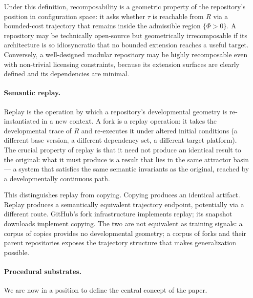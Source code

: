 \documentclass[11pt]{article}
\begin{document}
Under this definition, recomposability is a geometric property of the
repository's position in configuration space: it asks whether $\tau$ is
reachable from $R$ via a bounded-cost trajectory that remains inside the
admissible region $\{\Phi > 0\}$. A repository may be technically open-source
but geometrically irrecomposable if its architecture is so idiosyncratic that
no bounded extension reaches a useful target. Conversely, a well-designed
modular repository may be highly recomposable even with non-trivial licensing
constraints, because its extension surfaces are clearly defined and its
dependencies are minimal.

\paragraph{Semantic replay.}
Replay is the operation by which a repository's developmental geometry is
re-instantiated in a new context. A fork is a replay operation: it takes the
developmental trace of $R$ and re-executes it under altered initial conditions
(a different base version, a different dependency set, a different target
platform). The crucial property of replay is that it need not produce an
identical result to the original: what it must produce is a result that lies
in the same attractor basin --- a system that satisfies the same
semantic invariants as the original, reached by a developmentally continuous
path.

This distinguishes replay from copying. Copying produces an identical artifact.
Replay produces a semantically equivalent trajectory endpoint, potentially via
a different route. GitHub's fork infrastructure implements replay; its snapshot
downloads implement copying. The two are not equivalent as training signals:
a corpus of copies provides no developmental geometry; a corpus of forks and
their parent repositories exposes the trajectory structure that makes
generalization possible.

\paragraph{Procedural substrates.}
We are now in a position to define the central concept of the paper.
\end{document}
